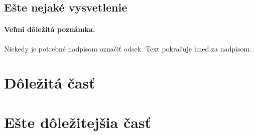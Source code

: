 \documentclass[10pt,twoside,slovak,a4paper]{article}
\begin{document}
\subsection{Ešte nejaké vysvetlenie} \label{ina:este}

\paragraph{Veľmi dôležitá poznámka.}
Niekedy je potrebné nadpisom označiť odsek. Text pokračuje hneď za nadpisom.



\section{Dôležitá časť} \label{dolezita}




\section{Ešte dôležitejšia časť} \label{dolezitejsia}








\end{document}
